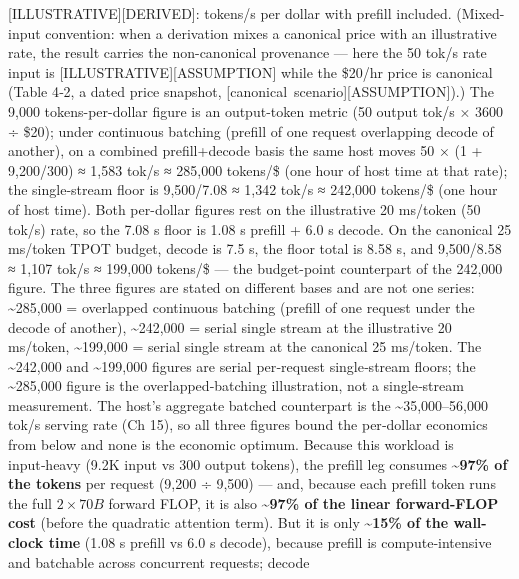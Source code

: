 \mbox{{[}ILLUSTRATIVE{]}}\hspace{0pt}\mbox{{[}DERIVED{]}}: tokens/s per dollar with prefill
included. (Mixed-input convention: when a derivation mixes a canonical
price with an illustrative rate, the result carries the non-canonical
provenance --- here the 50 tok/s rate input is
\mbox{{[}ILLUSTRATIVE{]}}\hspace{0pt}\mbox{{[}ASSUMPTION{]}} while the \$20/hr price is canonical
(Table 4‑2, a dated price snapshot, \mbox{{[}canonical
scenario{]}}\hspace{0pt}\mbox{{[}ASSUMPTION{]}}).) The 9,000 tokens-per-dollar figure is an
output-token metric (50 output tok/s × 3600 ÷ \$20); under continuous
batching (prefill of one request overlapping decode of another), on a
combined prefill+decode basis the same host moves 50 × (1 + 9,200/300) ≈
1,583 tok/s ≈ 285,000 tokens/\$ (one hour of host time at that rate);
the single-stream floor is 9,500/7.08 ≈ 1,342 tok/s ≈ 242,000 tokens/\$
(one hour of host time). Both per-dollar figures rest on the
illustrative 20 ms/token (50 tok/s) rate, so the 7.08 s floor is 1.08 s
prefill + 6.0 s decode. On the canonical 25 ms/token TPOT budget, decode
is 7.5 s, the floor total is 8.58 s, and 9,500/8.58 ≈ 1,107 tok/s ≈
199,000 tokens/\$ --- the budget-point counterpart of the 242,000
figure. The three figures are stated on different bases and are not one
series: \textasciitilde285,000 = overlapped continuous batching (prefill
of one request under the decode of another), \textasciitilde242,000 =
serial single stream at the illustrative 20 ms/token,
\textasciitilde199,000 = serial single stream at the canonical 25
ms/token. The \textasciitilde242,000 and \textasciitilde199,000 figures
are serial per‑request single‑stream floors; the \textasciitilde285,000
figure is the overlapped‑batching illustration, not a single‑stream
measurement. The host's aggregate batched counterpart is the
\textasciitilde35,000--56,000 tok/s serving rate (Ch 15), so all three
figures bound the per‑dollar economics from below and none is the
economic optimum. Because this workload is input‑heavy (9.2K input vs
300 output tokens), the prefill leg consumes \textbf{\textasciitilde97\%
of the tokens} per request (9,200 ÷ 9,500) --- and, because each prefill
token runs the full \(2\times70B\) forward FLOP, it is also
\textbf{\textasciitilde97\% of the linear forward-FLOP cost} (before the
quadratic attention term). But it is only \textbf{\textasciitilde15\% of
the wall-clock time} (1.08 s prefill vs 6.0 s decode), because prefill
is compute‑intensive and batchable across concurrent requests; decode
